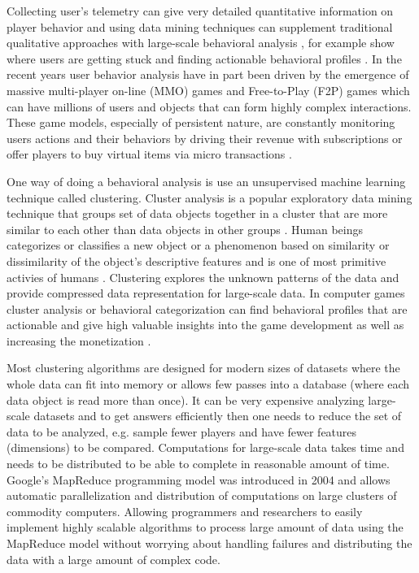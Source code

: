 Collecting user's telemetry can give very detailed quantitative information on player behavior and using data mining techniques can supplement traditional qualitative approaches with large-scale behavioral analysis \citep{Yannakakis:2012}, for example show where users are getting stuck and finding actionable behavioral profiles \citep{Kim:2008Tracking, Drachen:2012, Drachen:2011Evaluating}. In the recent years user behavior analysis have in part been driven by the emergence of massive multi-player on-line (MMO) games and Free-to-Play (F2P) games which can have millions of users and objects that can form highly complex interactions. These game models, especially of persistent nature, are constantly monitoring users actions and their behaviors by driving their revenue with subscriptions or offer players to buy virtual items via micro transactions \citep{Kim:2008Tracking, Drachen:2011Evaluating, Fields:2011SocialGame, Seif:2013GameAnalytics}. 

One way of doing a behavioral analysis is use an unsupervised machine learning technique called clustering. Cluster analysis is a popular exploratory data mining technique that groups set of data objects together in a cluster that are more similar to each other than data objects in other groups \citep{Xu:2005Clustering}. Human beings categorizes or classifies a new object or a phenomenon based on similarity or dissimilarity of the object's descriptive features and is one of most primitive activies of humans \citep{Anderberg:1973ClusterAnalysis}. Clustering explores the unknown patterns of the data and provide compressed data representation for large-scale data. In computer games cluster analysis or behavioral categorization can find behavioral profiles that are actionable and give high valuable insights into the game development as well as increasing the monetization \cite{Drachen:2009Tomb, Mahlmann:2010Tomb}. 

Most clustering algorithms are designed for modern sizes of datasets where the whole data can fit into memory or allows few passes into a database (where each data object is read more than once). It can be very expensive analyzing large-scale datasets and to get answers efficiently then one needs to reduce the set of data to be analyzed, e.g. sample fewer players and have fewer features (dimensions) to be compared. Computations for large-scale data takes time and needs to be distributed to be able to complete in reasonable amount of time. Google's MapReduce programming model was introduced in 2004 \citep{Dean:2004} and allows automatic parallelization and distribution of computations on large clusters of commodity computers. Allowing programmers and researchers to easily implement highly scalable algorithms to process large amount of data using the MapReduce model without worrying about handling failures and distributing the data with a large amount of complex code. 

